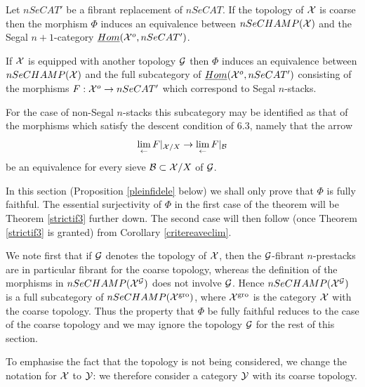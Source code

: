 \begin{theorem}
\label{correlation}
Let $nSeCAT'$ be a fibrant replacement of $nSeCAT$.
If the topology of ${\cal X}$ is
coarse then the morphism
$\Phi$ induces an equivalence between
$nSeCHAMP({\cal X} )$ and the
Segal $n+1$-category $\underline{Hom}({\cal X} ^o, nSeCAT')$.

If ${\cal X}$ is equipped with another topology
${\cal G}$ then $\Phi$ induces an equivalence between \newline
$nSeCHAMP({\cal X} )$ and the full subcategory
of
$\underline{Hom}({\cal X} ^o, nSeCAT')$ consisting of the morphisms
$F:{\cal X} ^o\rightarrow nSeCAT'$ which correspond to Segal $n$-stacks.

For the case of non-Segal $n$-stacks this subcategory may be
identified as that of the morphisms which
satisfy the descent condition
of \cite{limits} 6.3, namely that the arrow
$$
\lim _{\leftarrow} F|_{{\cal X} /X} \rightarrow
\lim _{\leftarrow} F|_{{\cal B}}
$$
be an equivalence for every sieve ${\cal B} \subset {\cal X} /X$ of ${\cal G}$.
\end{theorem}

In this section (Proposition \ref{pleinfidele} below) we shall
only
prove that $\Phi$ is fully faithful. The essential surjectivity of
$\Phi$ in the first case of the theorem
will be Theorem \ref{strictif3}
further down. The second case will then follow
(once Theorem \ref{strictif3} is granted) from Corollary
\ref{critereaveclim}.

We note first that if ${\cal G}$ denotes the
topology of ${\cal X}$,
then the ${\cal G}$-fibrant $n$-prestacks are in particular fibrant for the
coarse topology, whereas the definition of the morphisms in
$nSeCHAMP({\cal X} ^{{\cal G}})$
does not involve ${\cal G}$. Hence $nSeCHAMP({\cal X} ^{{\cal G}} )$ is a full
subcategory
of $nSeCHAMP({\cal X} ^{\rm gro})$, where ${\cal X} ^{\rm gro}$ is the category
${\cal X}$ with
the coarse topology. Thus the property that $\Phi$ be fully
faithful reduces to the case of the coarse topology
and we may ignore the topology ${\cal G}$
for the rest of this
section.

To emphasise the fact that the topology is not being considered, we change
the notation for ${\cal X}$ to ${\cal Y}$: we therefore consider a category ${\cal Y}$ with
its coarse topology.

